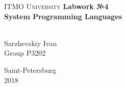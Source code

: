 \begin{titlepage}
\begin{center}

\textsc{ITMO University}
\vfill
\textbf{Labwork №4\\[4mm]
System Programming Languages}\\[16mm]
\begin{flushright}
~\\[2mm]Sarzhevskiy Ivan
~\\[2mm]Group P3202
\end{flushright}
\vfill
Saint-Petersburg\\[2mm]
2018

\end{center}
\end{titlepage}
